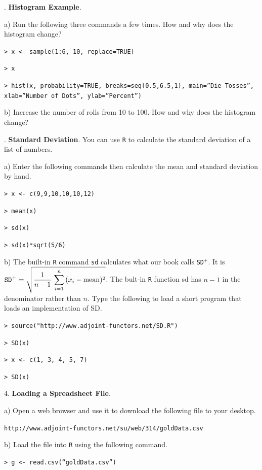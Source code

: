 \documentclass[10pt]{article}
\newcounter{EX}\setcounter{EX}{1}
\newcommand{\EXERCISE}{\arabic{EX}.\stepcounter{EX} }
\begin{document}
\EXERCISE \textbf{Histogram Example}.

\HX a) Run the following three commands a few times.  How and why does the histogram change?  


\HX\HX \texttt{>  x <- sample(1:6, 10, replace=TRUE)}

\HX\HX \texttt{>  x}

\HX\HX \texttt{>  hist(x, probability=TRUE, breaks=seq(0.5,6.5,1), main=''Die Tosses'', xlab=''Number of Dots'', ylab=''Percent'')}

\HX  b) Increase the number of rolls from 10 to 100.  How and why does the histogram change?  
\bigskip

\EXERCISE \textbf{Standard Deviation}. You can use \texttt{R} to calculate the standard
deviation of a list of numbers.  

\HX a) Enter the following commands then calculate the mean and standard deviation by hand.

\HX\HX \texttt{>  x <- c(9,9,10,10,10,12)}

\HX\HX \texttt{>  mean(x)}

\HX\HX \texttt{>  sd(x)}

\HX\HX \texttt{>  sd(x)*sqrt(5/6)}
\smallskip

\HX b) The built-in \texttt{R} command \texttt{sd} calculates
what our book calls \texttt{SD$^+$}.  It is 
$\mbox{\texttt{SD}}^+=
\displaystyle\sqrt{\frac{1}{n-1}\,\sum_{i=1}^n\,(x_i-\mbox{mean})^2}$.  
The bult-in \texttt{R} function \mbox{sd} has $n-1$ in 
the denominator rather than $n$.  Type the following to load a short program 
that loads an implementation of \mbox{SD}.  

\HX\HX \texttt{>  source("http://www.adjoint-functors.net/SD.R")}

\HX\HX \texttt{>  SD(x)}
\smallskip

\HX\HX \texttt{>  x <- c(1, 3, 4, 5, 7)}

\HX\HX \texttt{>  SD(x)}
\vfill
\eject

4. \textbf{Loading a Spreadsheet File}.

\HX a) Open a web browser and use it to download the following file to your desktop.
\begin{center}
\texttt{http://www.adjoint-functors.net/su/web/314/goldData.csv}
\end{center}

\HX b) Load the file into  \texttt{R} using the following command.

\HX\HX \texttt{>  g <- read.csv(``goldData.csv'')}
\end{document}
